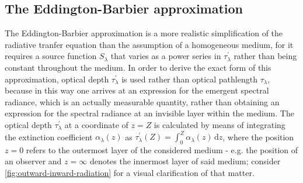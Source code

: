 \documentclass[a4paper,12pt]{report}
\begin{document}
\subsection{The Eddington-Barbier approximation}
The Eddington-Barbier approximation is a more realistic simplification of the radiative tranfer equation than the assumption of a homogeneous medium, for it requires a source function $S_\lambda$ that varies as a power series in $\tau_\lambda^\prime$ rather than being constant throughout the medium. In order to derive the exact form of this approximation, optical depth $\tau_\lambda^\prime$ is used rather than optical pathlength $\tau_\lambda$, because in this way one arrives at an expression for the emergent spectral radiance, which is an actually measurable quantity, rather than obtaining an expression for the spectral radiance at an invisible layer within the medium. The optical depth $\tau_\lambda^\prime$ at a coordinate of $z=Z$ is calculated by means of integrating the extinction coefficient $\alpha_\lambda(z)$ as $
\tau_\lambda^\prime(Z) = \int_{0}^{Z} \alpha_\lambda(z)\,\mathrm{d}z$, where the position $z=0$ refers to the outermost layer of the considered medium - e.g. the position of an observer and $z=\infty$ denotes the innermost layer of said medium; consider \cref{fig:outward-inward-radiation} for a visual clarification of that matter.
\end{document}
